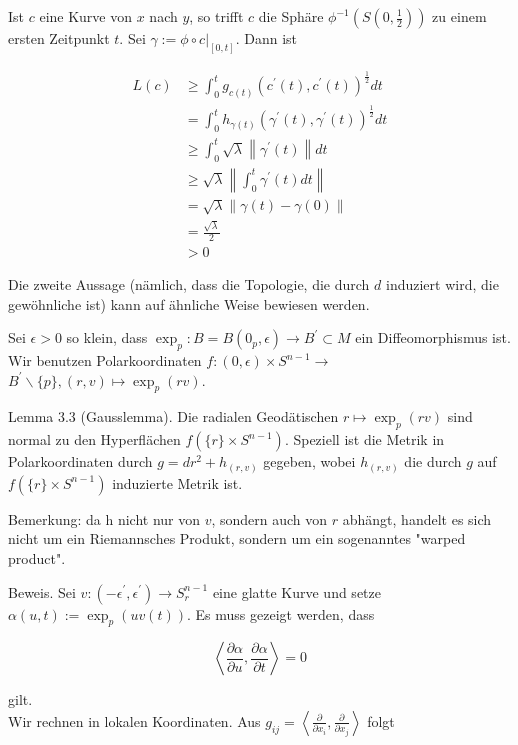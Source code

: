 \documentclass[10pt]{article}
\begin{document}
Ist $c$ eine Kurve von $x$ nach $y$, so trifft $c$ die Sphäre $\phi^{-1}\left(S\left(0, \frac{1}{2}\right)\right)$ zu einem ersten Zeitpunkt $t$. Sei $\gamma:=\left.\phi \circ c\right|_{[0, t]}$. Dann ist

$$
\begin{aligned}
L(c) & \geq \int_{0}^{t} g_{c(t)}\left(c^{\prime}(t), c^{\prime}(t)\right)^{\frac{1}{2}} d t \\
& =\int_{0}^{t} h_{\gamma(t)}\left(\gamma^{\prime}(t), \gamma^{\prime}(t)\right)^{\frac{1}{2}} d t \\
& \geq \int_{0}^{t} \sqrt{\lambda}\left\|\gamma^{\prime}(t)\right\| d t \\
& \geq \sqrt{\lambda}\left\|\int_{0}^{t} \gamma^{\prime}(t) d t\right\| \\
& =\sqrt{\lambda}\|\gamma(t)-\gamma(0)\| \\
& =\frac{\sqrt{\lambda}}{2} \\
& >0
\end{aligned}
$$

Die zweite Aussage (nämlich, dass die Topologie, die durch $d$ induziert wird, die gewöhnliche ist) kann auf ähnliche Weise bewiesen werden.

Sei $\epsilon>0$ so klein, dass $\exp _{p}: B=B\left(0_{p}, \epsilon\right) \rightarrow B^{\prime} \subset M$ ein Diffeomorphismus ist. Wir benutzen Polarkoordinaten $f:(0, \epsilon) \times S^{n-1} \rightarrow$ $B^{\prime} \backslash\{p\},(r, v) \mapsto \exp _{p}(r v)$.

Lemma 3.3 (Gausslemma). Die radialen Geodätischen $r \mapsto \exp _{p}(r v)$ sind normal zu den Hyperflächen $f\left(\{r\} \times S^{n-1}\right)$. Speziell ist die Metrik in Polarkoordinaten durch $g=d r^{2}+h_{(r, v)}$ gegeben, wobei $h_{(r, v)}$ die durch $g$ auf $f\left(\{r\} \times S^{n-1}\right)$ induzierte Metrik ist.

Bemerkung: da h nicht nur von $v$, sondern auch von $r$ abhängt, handelt es sich nicht um ein Riemannsches Produkt, sondern um ein sogenanntes "warped product".

Beweis. Sei $v:\left(-\epsilon^{\prime}, \epsilon^{\prime}\right) \rightarrow S_{r}^{n-1}$ eine glatte Kurve und setze $\alpha(u, t):=\exp _{p}(u v(t))$. Es muss gezeigt werden, dass

$$
\left\langle\frac{\partial \alpha}{\partial u}, \frac{\partial \alpha}{\partial t}\right\rangle=0
$$

gilt.\\
Wir rechnen in lokalen Koordinaten. Aus $g_{i j}=\left\langle\frac{\partial}{\partial x_{i}}, \frac{\partial}{\partial x_{j}}\right\rangle$ folgt
\end{document}
